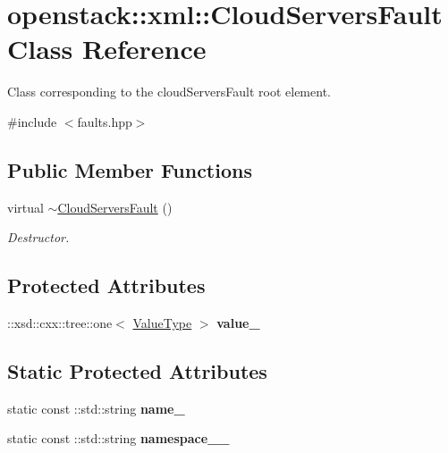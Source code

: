 \hypertarget{classopenstack_1_1xml_1_1CloudServersFault}{
\section{openstack::xml::CloudServersFault Class Reference}
\label{classopenstack_1_1xml_1_1CloudServersFault}
}


Class corresponding to the cloudServersFault root element.  




{\ttfamily \#include $<$faults.hpp$>$}

\subsection*{Public Member Functions}
\begin{DoxyCompactItemize}
\item 
\hypertarget{classopenstack_1_1xml_1_1CloudServersFault_a63caaf0da69de01679f39342f79ea1c5}{
virtual \hyperlink{classopenstack_1_1xml_1_1CloudServersFault_a63caaf0da69de01679f39342f79ea1c5}{$\sim$CloudServersFault} ()}
\label{classopenstack_1_1xml_1_1CloudServersFault_a63caaf0da69de01679f39342f79ea1c5}

\begin{DoxyCompactList}\small\item\em Destructor. \item\end{DoxyCompactList}\end{DoxyCompactItemize}
\subsection*{Protected Attributes}
\begin{DoxyCompactItemize}
\item 
\hypertarget{classopenstack_1_1xml_1_1CloudServersFault_ad8927f72d3885575989d7fc2e8b3dadd}{
::xsd::cxx::tree::one$<$ \hyperlink{classopenstack_1_1xml_1_1CloudServersAPIFault}{ValueType} $>$ {\bfseries value\_\-}}
\label{classopenstack_1_1xml_1_1CloudServersFault_ad8927f72d3885575989d7fc2e8b3dadd}

\end{DoxyCompactItemize}
\subsection*{Static Protected Attributes}
\begin{DoxyCompactItemize}
\item 
\hypertarget{classopenstack_1_1xml_1_1CloudServersFault_a1421ad8dddf737b5b2ad60918b7e531d}{
static const ::std::string {\bfseries name\_\-}}
\label{classopenstack_1_1xml_1_1CloudServersFault_a1421ad8dddf737b5b2ad60918b7e531d}

\item 
\hypertarget{classopenstack_1_1xml_1_1CloudServersFault_a127947041b25285924c3d6a62128d851}{
static const ::std::string {\bfseries namespace\_\-\_\-}}
\label{classopenstack_1_1xml_1_1CloudServersFault_a127947041b25285924c3d6a62128d851}

\end{DoxyCompactItemize}
